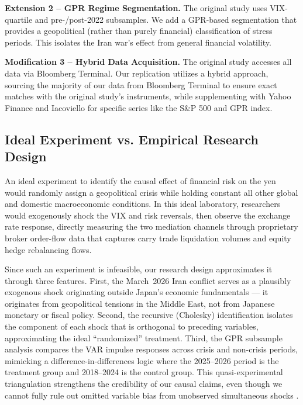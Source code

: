 \documentclass[12pt]{article}
\begin{document}
\textbf{Extension 2 -- GPR Regime Segmentation.} The original study uses VIX-quartile and pre-/post-2022 subsamples. We add a GPR-based segmentation that provides a geopolitical (rather than purely financial) classification of stress periods. This isolates the Iran war's effect from general financial volatility.

\textbf{Modification 3 -- Hybrid Data Acquisition.} The original study accesses all data via Bloomberg Terminal. Our replication utilizes a hybrid approach, sourcing the majority of our data from Bloomberg Terminal to ensure exact matches with the original study's instruments, while supplementing with Yahoo Finance and Iacoviello for specific series like the S\&P 500 and GPR index.

\subsection{Ideal Experiment vs. Empirical Research Design}

{} An ideal experiment to identify the causal effect of financial risk on the yen would randomly assign a geopolitical crisis while holding constant all other global and domestic macroeconomic conditions. In this ideal laboratory, researchers would exogenously shock the VIX and risk reversals, then observe the exchange rate response, directly measuring the two mediation channels through proprietary broker order-flow data that captures carry trade liquidation volumes and equity hedge rebalancing flows.

{} Since such an experiment is infeasible, our research design approximates it through three features. First, the March~2026 Iran conflict serves as a plausibly exogenous shock originating outside Japan's economic fundamentals --- it originates from geopolitical tensions in the Middle East, not from Japanese monetary or fiscal policy. Second, the recursive (Cholesky) identification isolates the component of each shock that is orthogonal to preceding variables, approximating the ideal \textquotedblleft randomized\textquotedblright{} treatment. Third, the GPR subsample analysis compares the VAR impulse responses across crisis and non-crisis periods, mimicking a difference-in-differences logic where the 2025--2026 period is the treatment group and 2018--2024 is the control group. This quasi-experimental triangulation strengthens the credibility of our causal claims, even though we cannot fully rule out omitted variable bias from unobserved simultaneous shocks \parencite{angrist2009mostly}.
\end{document}
